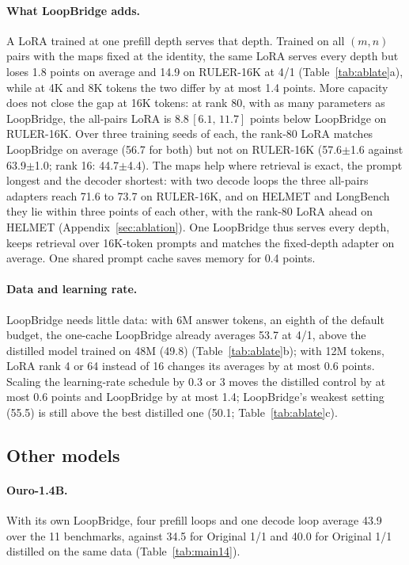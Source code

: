 \documentclass[11pt]{article}
\newcommand{\ci}[2]{\,{\scriptsize\ensuremath{[#1,\,#2]}}}
\begin{document}
\paragraph{What LoopBridge adds.} A LoRA trained at one prefill depth serves that depth. Trained on all $(m,n)$ pairs
with the maps fixed at the identity, the same LoRA serves every depth but loses 1.8 points on average and 14.9 on
RULER-16K at 4/1 (Table~\ref{tab:ablate}a), while at 4K and 8K tokens the two differ by at most 1.4 points. More
capacity does not close the gap at 16K tokens: at rank 80, with as many parameters as LoopBridge, the all-pairs LoRA is
8.8\ci{6.1}{11.7} points below LoopBridge on RULER-16K. Over three training seeds of each, the rank-80 LoRA matches
LoopBridge on average (56.7 for both) but not on RULER-16K (57.6$\pm$1.6 against 63.9$\pm$1.0; rank 16:
44.7$\pm$4.4). The maps help where retrieval is exact, the prompt longest and the decoder shortest: with two decode
loops the three all-pairs adapters reach 71.6 to 73.7 on RULER-16K, and on HELMET and LongBench they lie within three
points of each other, with the rank-80 LoRA ahead on HELMET (Appendix~\ref{sec:ablation}). One LoopBridge thus serves
every depth, keeps retrieval over 16K-token prompts and matches the fixed-depth adapter on average. One shared prompt
cache saves memory for 0.4 points.

\paragraph{Data and learning rate.} LoopBridge needs little data: with 6M answer tokens, an eighth of the default
budget, the one-cache LoopBridge already averages 53.7 at 4/1, above the distilled model trained on 48M (49.8)
(Table~\ref{tab:ablate}b); with 12M tokens, LoRA rank 4 or 64 instead of 16 changes its averages by at most 0.6
points. Scaling the learning-rate schedule by 0.3 or 3 moves the distilled
control by at most 0.6 points and LoopBridge by at most 1.4; LoopBridge's weakest setting (55.5) is still above the
best distilled one (50.1; Table~\ref{tab:ablate}c).

\subsection{Other models}
\label{sec:others}



\paragraph{Ouro-1.4B.} With its own LoopBridge, four prefill loops and one decode loop average 43.9 over the 11
benchmarks, against 34.5 for Original 1/1 and 40.0 for Original 1/1 distilled on the same data
(Table~\ref{tab:main14}).
\end{document}
